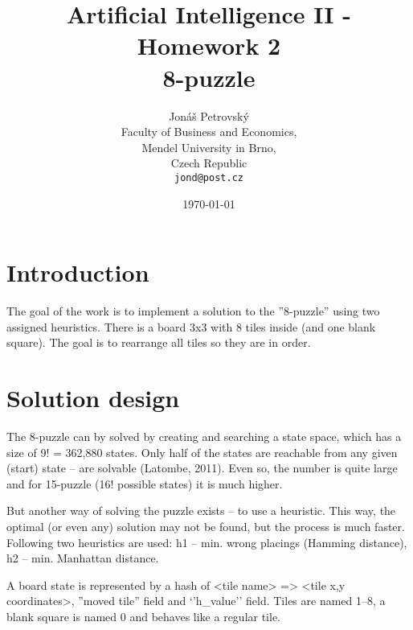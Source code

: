 \documentclass[a4paper]{article}
\begin{document}
\title{\vspace{-1.0cm}Artificial Intelligence II - Homework 2 \\ \textbf{8-puzzle}}
\author{Jonáš Petrovský\\
        Faculty of Business and Economics,\\
		Mendel University in Brno,\\
		Czech Republic \\
		\texttt{jond@post.cz}}
\date{\today}
\maketitle

\section{Introduction}
The goal of the work is to implement a solution to the ''8-puzzle'' using two assigned heuristics. There is a board 3x3 with 8 tiles inside (and one blank square). The goal is to rearrange all tiles so they are in order. 

\section{Solution design}
The 8-puzzle can by solved by creating and searching a state space, which has a size of 9! = 362,880 states. Only half of the states are reachable from any given (start) state -- are solvable (Latombe, 2011). Even so, the number is quite large and for 15-puzzle (16! possible states) it is much higher. 

But another way of solving the puzzle exists -- to use a heuristic. This way, the optimal (or even any) solution may not be found, but the process is much faster. Following two heuristics are used: h1 -- min. wrong placings (Hamming distance), h2 -- min. Manhattan distance.

A board state is represented by a hash of <tile name> => <tile x,y coordinates>, ''moved tile'' field and `'h\_value'' field. Tiles are named 1--8, a blank square is named 0 and behaves like a regular tile. 
\end{document}
